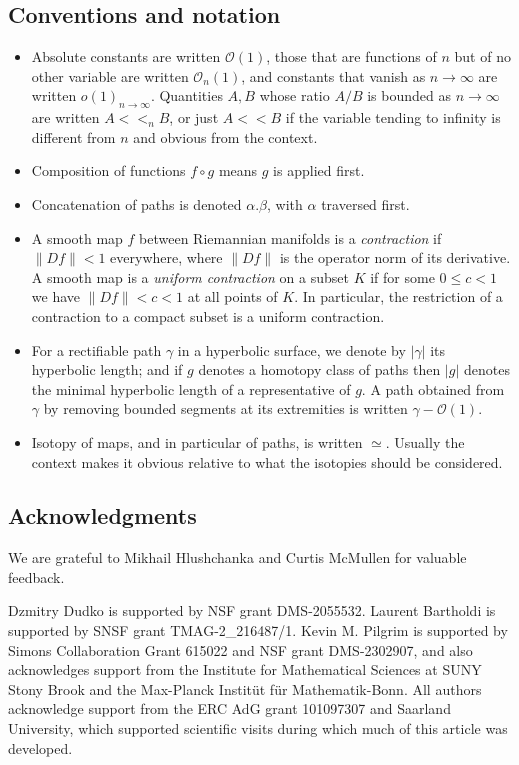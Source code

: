 \documentclass{amsart}
\theoremstyle{definition}
\theoremstyle{remark}
\renewcommand\ll{<\!\!<}
\begin{document}
\subsection{Conventions and notation}
\begin{itemize}
\item Absolute constants are written $\mathcal O(1)$, those that are functions of $n$ but of no other variable are written $\mathcal O_n(1)$, and constants that vanish as $n\to\infty$ are written $o(1)_{n\to\infty}$. Quantities $A,B$ whose ratio $A/B$ is bounded as $n\to\infty$ are written $A\ll_n B$, or just $A\ll B$ if the variable tending to infinity is different from $n$ and obvious from the context.
\item Composition of functions $f\circ g$ means $g$ is applied first. 
\item Concatenation of paths is denoted $\alpha.\beta$, with $\alpha$ traversed first. 
\item A smooth map $f$ between Riemannian manifolds is a \emph{contraction} if $\|Df\|<1$ everywhere, where $\|Df\|$ is the operator norm of its derivative.  A smooth map is a \emph{uniform contraction} on a subset $K$ if for some $0 \leq c < 1$ we have $\|Df\|<c<1$ at all points of $K$. In particular, the restriction of a contraction to a compact subset is a uniform contraction.
\item For a rectifiable path $\gamma$ in a hyperbolic surface, we denote by $|\gamma|$ its hyperbolic length; and if $g$ denotes a homotopy class of paths then $|g|$ denotes the minimal hyperbolic length of a representative of $g$. A path obtained from $\gamma$ by removing bounded segments at its extremities is written $\gamma-\mathcal O(1)$.
\item Isotopy of maps, and in particular of paths, is written $\simeq$. Usually the context makes it obvious relative to what the isotopies should be considered.
\end{itemize}

\subsection{Acknowledgments} We are grateful to Mikhail Hlushchanka and Curtis McMullen for valuable feedback. 

Dzmitry Dudko is supported by NSF grant DMS-2055532.
Laurent Bartholdi is supported by SNSF grant TMAG-2\_216487/1.
Kevin M. Pilgrim is supported by Simons Collaboration Grant 615022 and NSF grant DMS-2302907, and  also acknowledges support from the Institute for Mathematical Sciences at SUNY Stony Brook and the Max-Planck Instit\"ut f\"ur Mathematik-Bonn.  All authors acknowledge support from the ERC AdG grant 101097307 and Saarland University, which supported scientific visits during which much of this article was developed.
\end{document}
